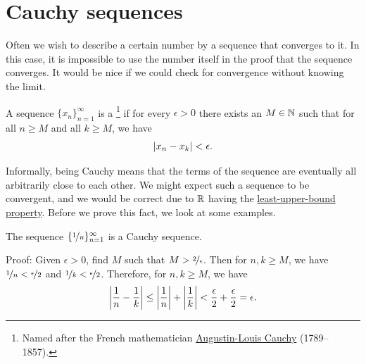 \sectionnewpage
\section{Cauchy sequences}
\label{sec:cauchy}


Often we wish to describe a certain number 
by a sequence that converges to it.  In this case, it is impossible to use the
number itself in the proof that the sequence converges.
It would be nice if we could check for convergence without knowing
the limit.

\begin{defn}
A sequence $\{ x_n \}_{n=1}^\infty$ is a \emph{}%
\footnote{%
Named after the French mathematician
\href{https://en.wikipedia.org/wiki/Cauchy}{Augustin-Louis Cauchy} (1789--1857).} if
for every $\epsilon > 0$ there exists an $M \in {\mathbb{N}}$ such that
for all $n \geq M$ and all $k \geq M$, we have
\begin{equation*}
\left\lvert {x_n - x_k} \right\rvert < \epsilon .
\end{equation*}
\end{defn}

Informally, being Cauchy means that the terms of the sequence are eventually
all arbitrarily close to each other.  We might expect such a sequence to be
convergent, and we would be correct due to ${\mathbb{R}}$ having the
\hyperref[defn:lub]{least-upper-bound property}.  Before we prove this fact,
we look at some examples.

\begin{example}
The sequence $\{ \nicefrac{1}{n} \}_{n=1}^\infty$ is a Cauchy sequence.

Proof:  Given $\epsilon > 0$, find $M$ such that
$M > \nicefrac{2}{\epsilon}$.  Then for $n,k \geq M$,
we have $\nicefrac{1}{n} < \nicefrac{\epsilon}{2}$
and
$\nicefrac{1}{k} < \nicefrac{\epsilon}{2}$.  Therefore, for $n, k \geq M$,
we have
\begin{equation*}
\left\lvert {\frac{1}{n} - \frac{1}{k}} \right\rvert
\leq
\left\lvert {\frac{1}{n}} \right\rvert + \left\lvert {\frac{1}{k}} \right\rvert
< \frac{\epsilon}{2} + \frac{\epsilon}{2} = \epsilon.
\end{equation*}
\end{example}

